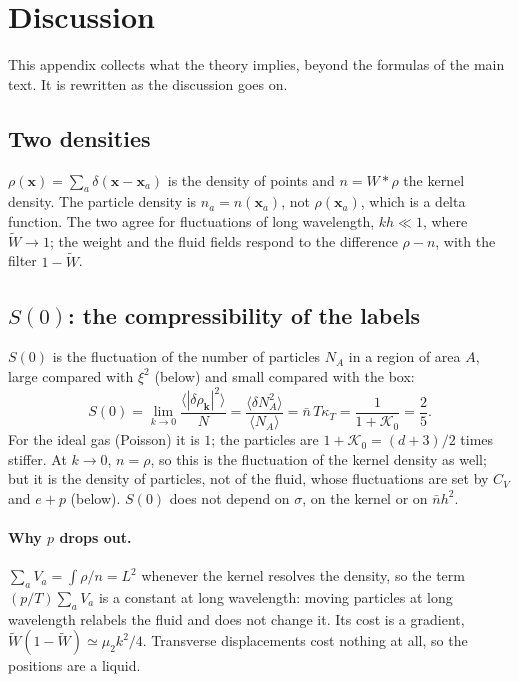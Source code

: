\documentclass[11pt,aps,preprint,nofootinbib,superscriptaddress,tightenlines]{revtex4-2}
\newcommand{\avg}[1]{\langle #1\rangle}
\def\st{\begin{equation}}
\def\stp{\end{equation}}
\let\oldparagraph\paragraph
\renewcommand{\paragraph}{\par\bigskip\oldparagraph}
\begin{document}
\section{Discussion}
\label{app:discussion}

This appendix collects what the theory implies, beyond the formulas of the main text.  It is rewritten as the discussion goes on.

\subsection{Two densities}

$\rho(\bm x)=\sum_a\delta(\bm x-\bm x_a)$ is the density of points and $n=W*\rho$ the kernel density.  The particle density is
$n_a=n(\bm x_a)$, not $\rho(\bm x_a)$, which is a delta function.  The two agree for fluctuations of long wavelength, $kh\ll1$, where
$\widetilde W\to1$; the weight and the fluid fields respond to the difference $\rho-n$, with the filter $1-\widetilde W$.

\subsection{$S(0)$: the compressibility of the labels}

$S(0)$ is the fluctuation of the number of particles $N_A$ in a region of area $A$, large compared with $\xi^2$ (below) and small compared
with the box:
\st
S(0)=\lim_{k\to0}\frac{\avg{|\delta\rho_{\bm k}|^2}}{N}=\frac{\avg{\delta N_A^2}}{\avg{N_A}}=\bar n\,T\kappa_T=\frac{1}{1+\mathcal K_0}=\frac25 .
\stp
For the ideal gas (Poisson) it is $1$; the particles are $1+\mathcal K_0=(d+3)/2$ times stiffer.  At $k\to0$, $n=\rho$, so this is the fluctuation of
the kernel density as well; but it is the density of particles, not of the fluid, whose fluctuations are set by $C_V$ and $e+p$ (below).
$S(0)$ does not depend on $\sigma$, on the kernel or on $\bar nh^2$.

\paragraph{Why $p$ drops out.}  $\sum_aV_a=\int\rho/n=L^2$ whenever the kernel resolves the density, so the term $(p/T)\sum_aV_a$ is a constant at
long wavelength: moving particles at long wavelength relabels the fluid and does not change it.  Its cost is a gradient,
$\widetilde W(1-\widetilde W)\simeq\mu_2k^2/4$.  Transverse displacements cost nothing at all, so the positions are a liquid.
\end{document}
